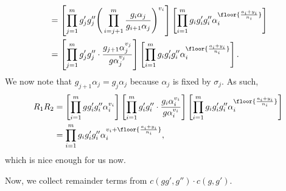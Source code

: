 \documentclass{article}
\numberwithin{equation}{section}
\begin{document}
\begin{enumerate}
\begin{align*}
		&= \left[\prod_{j=1}^mg'_jg''_j\Bigg(\prod_{i=j+1}^m\frac{g_i\alpha_j}{g_{i+1}\alpha_j}\Bigg)^{v_i}\right]\left[\prod_{i=1}^mg_ig'_ig''_i\alpha_i^{\floor{\frac{a_i+y_i}{n_i}}}\right] \\
		&= \left[\prod_{j=1}^mg'_jg''_j\cdot\frac{g_{j+1}\alpha_j^{v_j}}{g\alpha_j^{v_j}}\right]\left[\prod_{i=1}^mg_ig'_ig''_i\alpha_i^{\floor{\frac{a_i+y_i}{n_i}}}\right].
	\end{align*}
	We now note that $g_{j+1}\alpha_j=g_j\alpha_j$ because $\alpha_j$ is fixed by $\sigma_j$. As such,
	\begin{align*}
		R_1R_2 &= \left[\prod_{i=1}^mgg'_ig''_i\alpha_i^{v_i}\right]\left[\prod_{i=1}^mg'_ig''_i\cdot\frac{g_i\alpha_i^{v_i}}{g\alpha_i^{v_i}}\right]\left[\prod_{i=1}^mg_ig'_ig''_i\alpha_i^{\floor{\frac{a_i+y_i}{n_i}}}\right] \\
		&= \prod_{i=1}^mg_ig'_ig''_i\alpha_i^{v_i+\floor{\frac{a_i+y_i}{n_i}}},
	\end{align*}
	which is nice enough for us now.
\end{enumerate}
Now, we collect remainder terms from $c(gg',g'')\cdot c(g,g')$.
\end{document}
